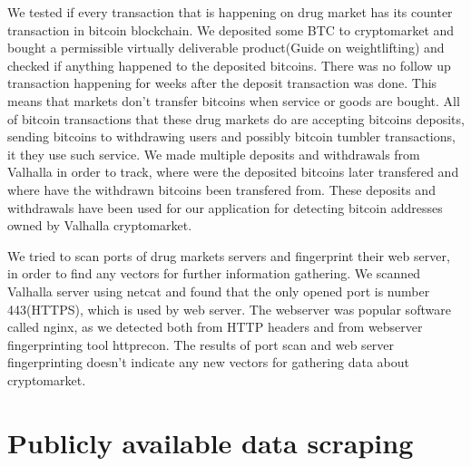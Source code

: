\documentclass[
  digital, %
  table,   %
  lof,     %
  lot,     %
  oneside
]{fithesis3}
\begin{document}
We tested if every transaction that is happening on drug market has its counter transaction
in bitcoin blockchain.
We deposited some BTC to cryptomarket and bought a permissible virtually deliverable
product(Guide on weightlifting) and checked if anything happened to the deposited bitcoins.
There was no follow up transaction happening for weeks after the deposit transaction was done.
This means that markets don't transfer bitcoins when service or goods are bought.
All of bitcoin transactions that these drug markets do 
are accepting bitcoins deposits,
sending bitcoins to withdrawing users and possibly bitcoin tumbler transactions, it they
use such service.
We made multiple deposits and withdrawals from Valhalla in order to track,
where were the deposited bitcoins later transfered and where have the withdrawn
bitcoins been transfered from. These deposits and withdrawals have been
used for our application for detecting bitcoin addresses owned by Valhalla cryptomarket.

We tried to scan ports of drug markets servers and fingerprint their web server,
in order to find any vectors for further information gathering.
We scanned Valhalla server using netcat and found that the only opened port is number 443(HTTPS),
which is used by web server. The webserver was popular software called nginx, as we detected
both from HTTP headers and from webserver fingerprinting tool httprecon.
The results of port scan and web server fingerprinting doesn't indicate
any new vectors for gathering data about cryptomarket.

\section{Publicly available data scraping}
\label{Publicly available data scraping}
\end{document}
